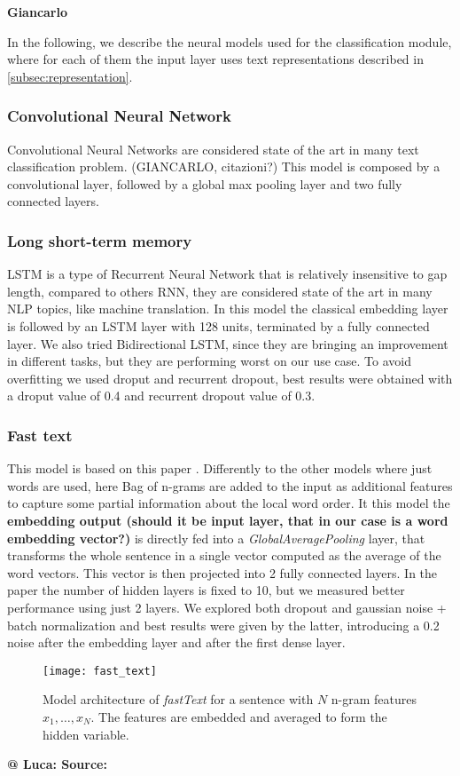 \textbf{Giancarlo}

In the following, we describe the neural models used for the classification module, where for each of them the input layer uses text representations described in \cref{subsec:representation}.


\subsubsection{Convolutional Neural Network}
Convolutional Neural Networks are considered state of the art in many text classification problem. (GIANCARLO, citazioni?)
This model is composed by a convolutional layer, followed by a global max pooling layer and two fully connected layers.

\subsubsection{Long short-term memory}
LSTM is a type of Recurrent Neural Network that is relatively insensitive to gap length, compared to others RNN, they are considered state of the art in many NLP topics, like machine translation.
In this model the classical embedding layer is followed by an LSTM layer with 128 units, terminated by a fully connected layer.
We also tried Bidirectional LSTM, since they are bringing an improvement in different tasks, but they are performing worst on our use case.
To avoid overfitting we used droput and recurrent dropout, best results were obtained with a droput value of 0.4 and recurrent dropout value of 0.3.

\subsubsection{Fast text}
This model is based on this paper \cite{joulin2016bag}.
Differently to the other models where just words are used, here Bag of n-grams are added to the input as  additional features to capture some partial information about the local word order.
It this model the \textbf{embedding output (should it be input layer, that in our case is a word embedding vector?)} is directly fed into a \emph{GlobalAveragePooling} layer, that transforms the whole sentence in a single vector computed as the average of the word vectors.
This vector is then projected into 2 fully connected layers. In the paper the number of hidden layers is fixed to 10, but we measured better performance using just 2 layers.
We explored both dropout and gaussian noise + batch normalization and best results were given by the latter, introducing a 0.2 noise after the embedding layer and after the first dense layer.
\begin{figure}[h]
\centering
\texttt{[image: fast\_text]}
\caption{\cite{joulin2016bag} Model architecture of \emph{fastText} for a sentence with $N$ n-gram features $x_1,\dots,x_N$. The features are embedded and averaged to form the hidden variable.}
\label{fig:fastText}
\end{figure}
\textbf{@ Luca: Source:  }


